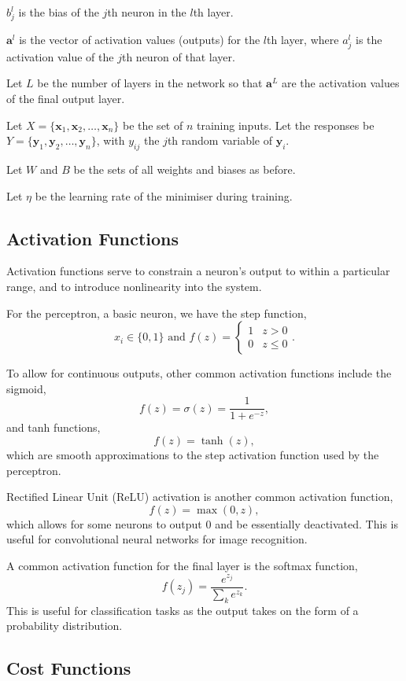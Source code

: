 \documentclass[honours,12pt]{unswthesis}
\numberwithin{equation}{section}
\begin{document}
$b_j^l$ is the bias of the $j$th neuron in the $l$th layer.

$\mathbf{a}^l$ is the vector of activation values (outputs) for the $l$th layer, where $a_j^l$ is the activation value of the $j$th neuron of that layer.

Let $L$ be the number of layers in the network so that $\mathbf{a}^L$ are the activation values of the final output layer.

Let $X = \{\mathbf{x}_1, \mathbf{x}_2, \ldots, \mathbf{x}_n\}$ be the set of $n$ training inputs. Let the responses be $Y = \{\mathbf{y}_1, \mathbf{y}_2, \ldots, \mathbf{y}_n\}$, with $y_{ij}$ the $j$th random variable of $\mathbf{y}_i$.

Let $W$ and $B$ be the sets of all weights and biases as before.

Let $\eta$ be the learning rate of the minimiser during training.

\subsection{Activation Functions}\label{nnets-act}

Activation functions serve to constrain a neuron's output to within a particular range, and to introduce nonlinearity into the system. 

For the perceptron, a basic neuron, we have the step function,
\[
	x_i \in \{0,1\} \text{ and } f(z) = \begin{cases}
		1 & z > 0 \\
		0 & z \le 0
	\end{cases}.
\]

To allow for continuous outputs, other common activation functions include the sigmoid,
\[
	f(z) = \sigma(z) = \dfrac{1}{1+e^{-z}},
\]
and tanh functions,
\[
	f(z) = \tanh(z),
\]
which are smooth approximations to the step activation function used by the perceptron.

Rectified Linear Unit (ReLU) activation is another common activation function,
\[
	f(z) = \max(0, z),
\]
which allows for some neurons to output 0 and be essentially deactivated. This is useful for convolutional neural networks for image recognition.

A common activation function for the final layer is the softmax function,
\[
	f(z_j) = \dfrac{e^{z_j}}{\sum_ke^{z_k}}.
\]
This is useful for classification tasks as the output takes on the form of a probability distribution.

\subsection{Cost Functions}\label{nnets-cost}
\end{document}
